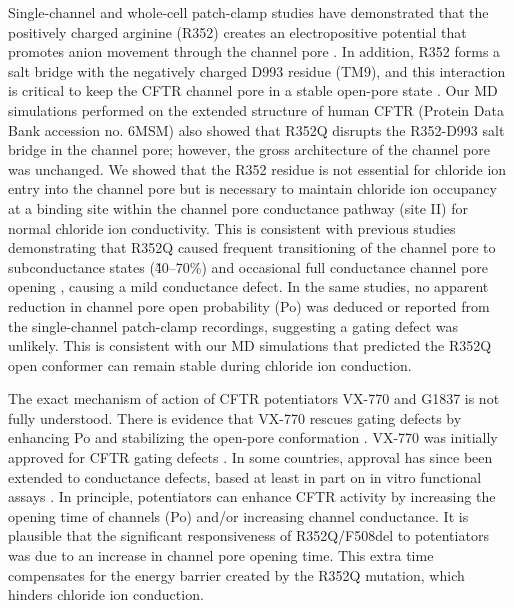 Single-channel and whole-cell patch-clamp studies have demonstrated that the positively charged arginine (R352) creates an electropositive potential that promotes anion movement through the channel pore \cite{guinamard1999}. In addition, R352 forms a salt bridge with the negatively charged D993 residue (TM9), and this interaction is critical to keep the CFTR channel pore in a stable open-pore state \cite{cui2013a}. Our MD simulations performed on the extended structure of human CFTR (Protein Data Bank accession no. 6MSM) also showed that R352Q disrupts the R352-D993 salt bridge in the channel pore; however, the gross architecture of the channel pore was unchanged. We showed that the R352 residue is not essential for chloride ion entry into the channel pore but is necessary to maintain chloride ion occupancy at a binding site within the channel pore conductance pathway (site II) for normal chloride ion conductivity. This is consistent with previous studies demonstrating that R352Q caused frequent transitioning of the channel pore to subconductance states (\~40–70\%) and occasional full conductance channel pore opening \cite{zhang2017, cui2008}, causing a mild conductance defect. In the same studies, no apparent reduction in channel pore open probability (Po) was deduced or reported from the single-channel patch-clamp recordings, suggesting a gating defect was unlikely. This is consistent with our MD simulations that predicted the R352Q open conformer can remain stable during chloride ion conduction.

The exact mechanism of action of CFTR potentiators VX-770 and G1837 is not fully understood. There is evidence that VX-770 rescues gating defects by enhancing Po and stabilizing the open-pore conformation \cite{jih2017}. VX-770 was initially approved for CFTR gating defects \cite{fda_kalydeco_approval}. In some countries, approval has since been extended to conductance defects, based at least in part on in vitro functional assays \cite{vangoor2014, fda_kalydeco_2_years_or_older}. In principle, potentiators can enhance CFTR activity by increasing the opening time of channels (Po) and/or increasing channel conductance. It is plausible that the significant responsiveness of R352Q/F508del to potentiators was due to an increase in channel pore opening time. This extra time compensates for the energy barrier created by the R352Q mutation, which hinders chloride ion conduction.

